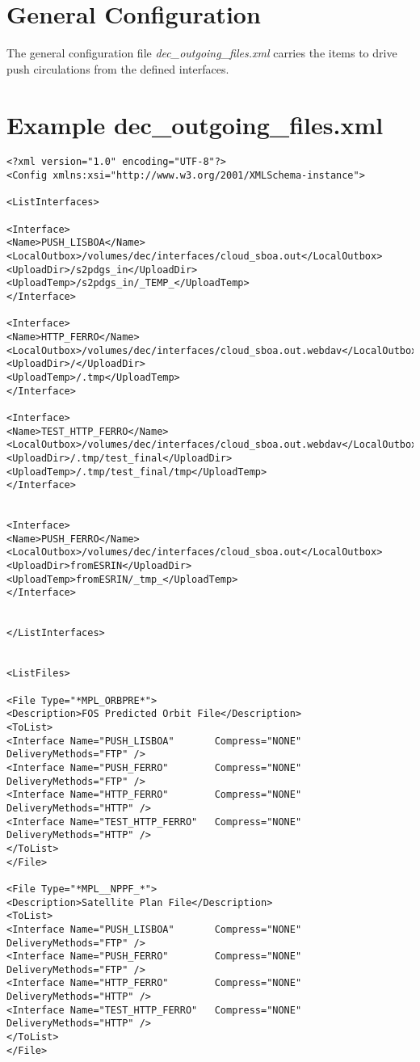 \documentclass[dec_sum_main.tex]{subfiles}
\begin{document}
\section{General Configuration}
 
\par
\noindent
The general configuration file \textit{dec\_outgoing\_files.xml} carries the items to drive push circulations from the defined interfaces.


\label{decoutgoingfilesxml}
\section{Example dec\_outgoing\_files.xml}
\begin{Verbatim}
<?xml version="1.0" encoding="UTF-8"?>
<Config xmlns:xsi="http://www.w3.org/2001/XMLSchema-instance">

<ListInterfaces>

<Interface>
<Name>PUSH_LISBOA</Name>
<LocalOutbox>/volumes/dec/interfaces/cloud_sboa.out</LocalOutbox>
<UploadDir>/s2pdgs_in</UploadDir>
<UploadTemp>/s2pdgs_in/_TEMP_</UploadTemp>
</Interface>

<Interface>
<Name>HTTP_FERRO</Name>
<LocalOutbox>/volumes/dec/interfaces/cloud_sboa.out.webdav</LocalOutbox>
<UploadDir>/</UploadDir>
<UploadTemp>/.tmp</UploadTemp>
</Interface>

<Interface>
<Name>TEST_HTTP_FERRO</Name>
<LocalOutbox>/volumes/dec/interfaces/cloud_sboa.out.webdav</LocalOutbox>
<UploadDir>/.tmp/test_final</UploadDir>
<UploadTemp>/.tmp/test_final/tmp</UploadTemp>
</Interface>


<Interface>
<Name>PUSH_FERRO</Name>
<LocalOutbox>/volumes/dec/interfaces/cloud_sboa.out</LocalOutbox>
<UploadDir>fromESRIN</UploadDir>
<UploadTemp>fromESRIN/_tmp_</UploadTemp>
</Interface>


</ListInterfaces>


<ListFiles>

<File Type="*MPL_ORBPRE*">
<Description>FOS Predicted Orbit File</Description>
<ToList>
<Interface Name="PUSH_LISBOA"       Compress="NONE"   DeliveryMethods="FTP" />
<Interface Name="PUSH_FERRO"        Compress="NONE"   DeliveryMethods="FTP" />
<Interface Name="HTTP_FERRO"        Compress="NONE"   DeliveryMethods="HTTP" />
<Interface Name="TEST_HTTP_FERRO"   Compress="NONE"   DeliveryMethods="HTTP" />
</ToList>
</File>

<File Type="*MPL__NPPF_*">
<Description>Satellite Plan File</Description>
<ToList>
<Interface Name="PUSH_LISBOA"       Compress="NONE"   DeliveryMethods="FTP" />
<Interface Name="PUSH_FERRO"        Compress="NONE"   DeliveryMethods="FTP" />
<Interface Name="HTTP_FERRO"        Compress="NONE"   DeliveryMethods="HTTP" />
<Interface Name="TEST_HTTP_FERRO"   Compress="NONE"   DeliveryMethods="HTTP" />
</ToList>
</File>


\end{Verbatim}
\end{document}
